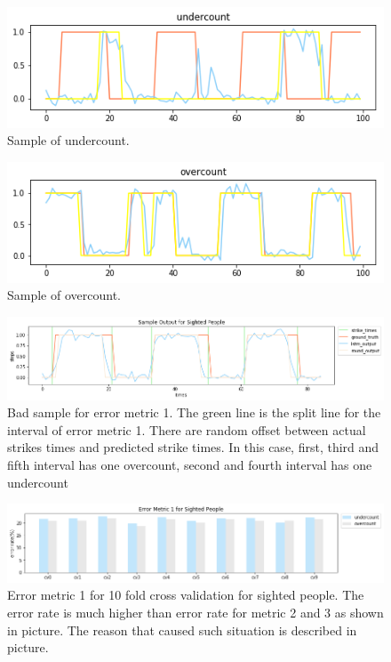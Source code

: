 \documentclass[11pt]{article}
\begin{document}
\begin{figure}[ht]
\centering
\includegraphics[scale=0.4]{undercount}
\caption{Sample of undercount.}
\label{fig:undercount}
\end{figure}

\begin{figure}[ht]
\centering
\includegraphics[scale=0.4]{overcount}
\caption{Sample of overcount.}
\label{fig:overcount}
\end{figure}


\begin{figure}[ht]
\centering
\includegraphics[scale=0.5]{output_small_metric2}
\caption{Bad sample for error metric 1. The green line is the split line for the interval of error metric 1. There are random offset between actual strikes times and predicted strike times. In this case, first, third and fifth interval has one overcount, second and fourth interval has one undercount}
\label{fig:output_small_metric2}
\end{figure}




\begin{figure}[ht]
\centering
\includegraphics[scale=0.5]{error_metric_1_na_10fold}
\caption{Error metric 1 for 10 fold cross validation for sighted people. The error rate is much higher than error rate for metric 2 and 3 as shown in picture. The reason that caused such situation is described in picture.}
\label{fig:error_metric_1_na_10fold}
\end{figure}
\end{document}

